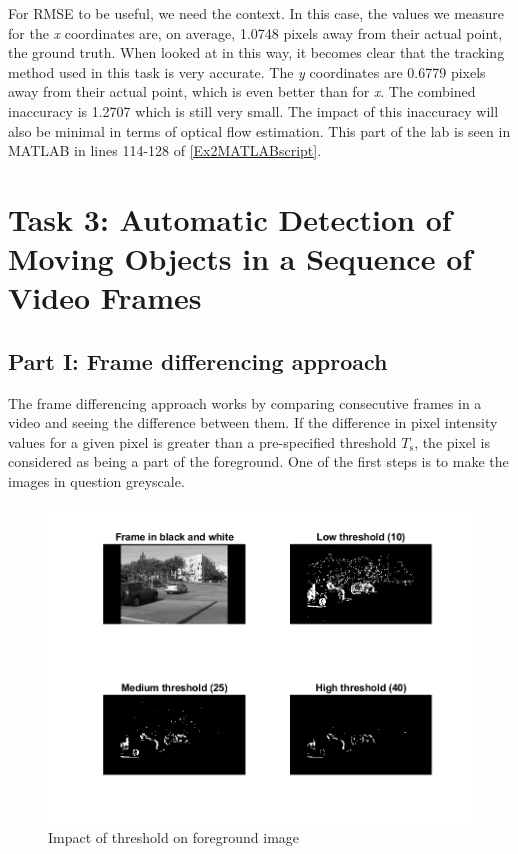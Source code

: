 \documentclass[11pt, letterpaper]{article}
\begin{document}
For RMSE to be useful, we need the context. In this case, the values we measure for the \textit{x} coordinates are, on average, 1.0748 pixels away from their actual point, the ground truth. When looked at in this way, it becomes clear that the tracking method used in this task is very accurate. The \textit{y} coordinates are 0.6779 pixels away from their actual point, which is even better than for \textit{x}. The combined inaccuracy is 1.2707 which is still very small. The impact of this inaccuracy will also be minimal in terms of optical flow estimation. This part of the lab is seen in MATLAB in lines 114-128 of \ref{Ex2MATLABscript}.

\clearpage
\section{Task 3: Automatic Detection of Moving Objects in a Sequence of Video Frames}

\subsection{Part I: Frame differencing approach}
The frame differencing approach works by comparing consecutive frames in a video and seeing the difference between them. If the difference in pixel intensity values for a given pixel is greater than a pre-specified threshold \begin{math}T_{\mathrm{s}}\end{math}, the pixel is considered as being a part of the foreground. One of the first steps is to make the images in question greyscale.

\begin{figure}[ht]
    \centering
    \includegraphics[width=0.75\linewidth]{Lab 3/CompareThresholds.png}
    \caption{Impact of threshold on foreground image}
    \label{fig:CompareThresholds}
\end{figure}
\end{document}
